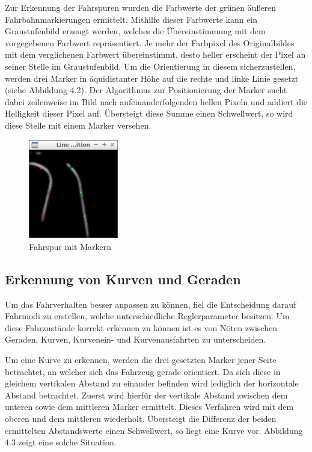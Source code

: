 Zur Erkennung der Fahrspuren wurden die Farbwerte der grünen äußeren Fahrbahnmarkierungen ermittelt. Mithilfe dieser Farbwerte kann ein Graustufenbild erzeugt werden, welches die Übereinstimmung mit dem vorgegebenen Farbwert repräsentiert. Je mehr der Farbpixel des Originalbildes mit dem verglichenen Farbwert übereinstimmt, desto heller erscheint der Pixel an seiner Stelle im Graustufenbild. Um die Orientierung in diesem sicherzustellen, werden drei Marker in äquidistanter Höhe auf die rechte und linke Linie gesetzt (siehe Abbildung 4.2). Der Algorithmus zur Positionierung der Marker sucht dabei zeilenweise im Bild nach aufeinanderfolgenden hellen Pixeln und addiert die Helligkeit dieser Pixel auf. Übersteigt diese Summe einen Schwellwert, so wird diese Stelle mit einem Marker versehen.

\begin{figure}[ht]
	\centering
	\includegraphics[width=0.35\textwidth]{images/isnt_straight_original.png}
	\caption{Fahrspur mit Markern}
\end{figure}
\label{Bild von Fahrspuren}

\subsection{Erkennung von Kurven und Geraden}
\label{sec:kurvenerkennung}
Um das Fahrverhalten besser anpassen zu können, fiel die Entscheidung darauf Fahrmodi zu erstellen, welche unterschiedliche Reglerparameter besitzen. Um diese Fahrzustände korrekt erkennen zu können ist es von Nöten zwischen Geraden, Kurven, Kurvenein- und Kurvenausfahrten zu unterscheiden.

Um eine Kurve zu erkennen, werden die drei gesetzten Marker jener Seite betrachtet, an welcher sich das Fahrzeug gerade orientiert. Da sich diese in gleichem vertikalen Abstand zu einander befinden wird lediglich der horizontale Abstand betrachtet. Zuerst wird hierfür der vertikale Abstand zwischen dem unteren sowie dem mittleren Marker ermittelt. Dieses Verfahren wird mit dem oberen und dem mittleren wiederholt. Übersteigt die Differenz der beiden ermittelten Abstandswerte einen Schwellwert, so liegt eine Kurve vor. Abbildung 4.3 zeigt eine solche Situation.

